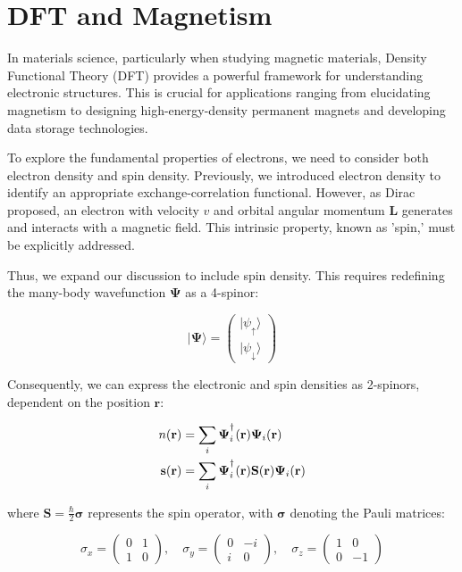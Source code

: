 \section{DFT and Magnetism}
\label{section.DFT_magnetism}
In materials science, particularly when studying magnetic materials, Density Functional Theory (DFT) provides a powerful framework for understanding electronic structures. This is crucial for applications ranging from elucidating magnetism to designing high-energy-density permanent magnets and developing data storage technologies.

To explore the fundamental properties of electrons, we need to consider both electron density and spin density. Previously, we introduced electron density to identify an appropriate exchange-correlation functional. However, as Dirac proposed, an electron with velocity \( v \) and orbital angular momentum \( \mathbf{L} \) generates and interacts with a magnetic field. This intrinsic property, known as 'spin,' must be explicitly addressed.

Thus, we expand our discussion to include spin density. This requires redefining the many-body wavefunction \( \mathbf{\Psi} \) as a 4-spinor:

\begin{equation}
	| \mathbf{\Psi} \rangle = \begin{pmatrix}
		|\psi_{\uparrow} \rangle \\
		| \psi_{\downarrow} \rangle
	\end{pmatrix}
\end{equation}

Consequently, we can express the electronic and spin densities as 2-spinors, dependent on the position \( \mathbf{r} \):

\begin{align}
	n (\mathbf{r}) &= \sum_{i} \mathbf{\Psi}_{i}^{\textsuperscript{\textdagger}} (\mathbf{r}) \mathbf{\Psi}_{i} (\mathbf{r}) \\
	\mathbf{s} (\mathbf{r}) &= \sum_{i} \mathbf{\Psi}_{i}^{\textsuperscript{\textdagger}} (\mathbf{r}) \mathbf{S} (\mathbf{r}) \mathbf{\Psi}_{i} (\mathbf{r})
\end{align}

where \( \mathbf{S} = \frac{\hbar}{2} \mathbf{\sigma} \) represents the spin operator, with \( \mathbf{\sigma} \) denoting the Pauli matrices:

\begin{equation}
	\sigma_{x} = \begin{pmatrix}
		0 & 1 \\
		1 & 0
	\end{pmatrix}, \quad
	\sigma_{y} = \begin{pmatrix}
		0 & -i \\
		i & 0
	\end{pmatrix}, \quad
	\sigma_{z} = \begin{pmatrix}
		1 & 0 \\
		0 & -1
	\end{pmatrix}
\end{equation}

